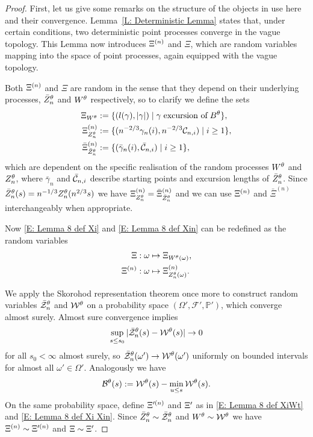 \begin{proof}
	First, let us give some remarks on the structure of the objects in use here and their convergence.
	Lemma~\ref{L: Deterministic Lemma} states that, under certain conditions, two deterministic point processes converge in the vague topology.
	This Lemma now introduces $\Xi^{(n)}$ and $\Xi$, which are random variables mapping into the space of point processes, again equipped with the vague topology.
	
	Both $\Xi^{(n)}$ and $\Xi$ are random in the sense that they depend on their underlying processes, $\bar{Z}^{\theta}_n$ and $W^{\theta}$ respectively,
	so to clarify we define the sets
	\begin{equation} \label{E: Lemma 8 def XiWt}
	\begin{aligned}
	\Xi_{W^{\theta}} &:= \{ (l(\gamma), |\gamma|) \; | \; \gamma \; \text{excursion of} \; B^{\theta}\}, \\
	\Xi^{(n)}_{Z_n^{\theta}} &:= \{ ( n^{-2 / 3} \gamma_n(i), n^{-2 / 3} \mathcal{C}_{n,i} ) \; | \; i \geq 1 \}, \\
	\bar{\Xi}^{(n)}_{\bar{Z}^{\theta}_n} &:= \{ ( \bar{\gamma}_n(i), \bar{\mathcal{C}}_{n,i} ) \; | \; i \geq 1 \},
	\end{aligned}
	\end{equation}
	which are dependent on the specific realisation of the random processes $W^{\theta}$ and $Z_n^{\theta}$,
	where $\bar{\gamma}_n$ and $\bar{\mathcal{C}}_{n,i}$ describe starting points and excursion lengths of $\bar{Z}^{\theta}_n$.
	Since $\bar{Z}^{\theta}_n(s) = n^{-1 / 3}Z_n^{\theta}(n^{2 / 3}s)$ we have $\Xi^{(n)}_{Z_n^{\theta}} = \bar{\Xi}^{(n)}_{\bar{Z}^{\theta}_n}$
	and we can use $\Xi^{(n)}$ and $\bar{\Xi}^{(n)}$ interchangeably when appropriate.
	
	Now \eqref{E: Lemma 8 def Xi} and \eqref{E: Lemma 8 def Xin} can be redefined as the random variables
	\begin{equation} \label{E: Lemma 8 def Xi Xin}
	\begin{aligned}
	\Xi : \; &\omega \mapsto \Xi_{W^{\theta}(\omega)}, \\
	\Xi^{(n)} : \; &\omega \mapsto \Xi^{(n)}_{Z_n^{\theta}(\omega)}.
	\end{aligned}
	\end{equation}
	
	We apply the Skorohod representation theorem once more
	to construct random variables
	$\bar{\mathcal{Z}}^{\theta}_n$ and $\mathcal{W}^{\theta}$ on a probability space $(\Omega', \mathcal{F}', \mathbb{P}')$,
	which converge almost surely.
	Almost sure convergence implies
	\begin{equation}
	\sup_{s \leq s_0}|\bar{\mathcal{Z}}^{\theta}_n(s) - \mathcal{W}^{\theta}(s)| \rightarrow 0
	\end{equation}
	for all $s_0 < \infty$ almost surely,
	so $\bar{\mathcal{Z}}^{\theta}_n(\omega') \rightarrow \mathcal{W}^{\theta}(\omega')$ uniformly on bounded intervals for almost all $\omega' \in \Omega'$. 
	Analogously we have
	\begin{equation}
		\mathcal{B}^{\theta}(s) := \mathcal{W}^{\theta}(s) - \min_{u \leq s}\mathcal{W}^{\theta}(s).
	\end{equation}
	On the same probability space, define $\Xi^{\prime (n)}$ and $\Xi^{\prime}$ as in \eqref{E: Lemma 8 def XiWt} and \eqref{E: Lemma 8 def Xi Xin}.
	Since $\bar{Z}^{\theta}_n \sim \bar{\mathcal{Z}}^{\theta}_n$ and $W^{\theta} \sim \mathcal{W}^{\theta}$ we have $\Xi^{(n)} \sim \Xi^{\prime (n)}$ and $\Xi \sim \Xi^{\prime}$.
	

\end{proof}
